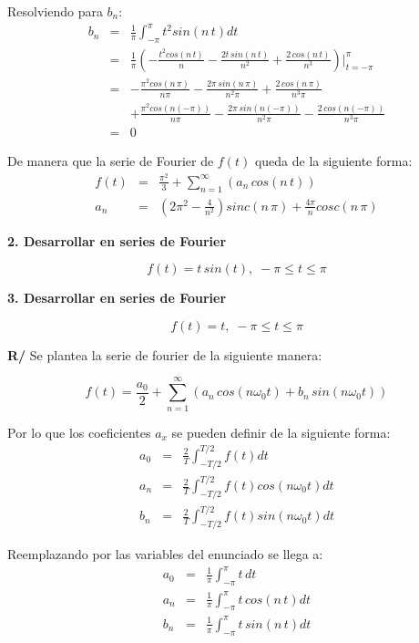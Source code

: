 \documentclass[twocolumn]{article}
\begin{document}
Resolviendo para $b_n$:
\begin{eqnarray*}
b_n &=& \frac{1}{\pi}\int_{-\pi}^{\pi}t^2sin(n\,t)dt\\
&=& \frac{1}{\pi} \left(-\frac{t^2cos(n\,t)}{n} - \frac{2t\,sin(n\,t)}{n^2} + \frac{2\,cos(n\,t)}{n^3}\right)\bigg|_{t=-\pi}^{\pi}\\
&=& -\frac{\pi^2cos(n\,\pi)}{n\pi} - \frac{2\pi\,sin(n\,\pi)}{n^2\pi} + \frac{2\,cos(n\,\pi)}{n^3\pi}\\
& &+ \frac{\pi^2cos(n(-\pi))}{n\pi} - \frac{2\pi\,sin(n(-\pi))}{n^2\pi} - \frac{2\,cos(n(-\pi))}{n^3\pi}\\
&=& 0
\end{eqnarray*}

De manera que la serie de Fourier de $f(t)$ queda de la siguiente forma:
\begin{eqnarray*}
f(t) &=& \frac{\pi^2}{3} + \sum_{n=1}^\infty\left(a_n\,cos(n\,t)\right)\\
a_n &=& \left(2\pi^2  - \frac{4}{n^2} \right) sinc(n\,\pi) + \frac{4\pi}{n}cosc(n\,\pi)
\end{eqnarray*}

\textbf{2. Desarrollar en series de Fourier}

$$f(t) = t \, sin(t),\; -\pi \leq t \leq \pi$$

\textbf{3. Desarrollar en series de Fourier}

$$f(t) = t,\; -\pi \leq t \leq \pi$$

\textbf{R/} Se plantea la serie de fourier de la siguiente manera:

$$f(t) = \frac{a_0}{2} + \sum_{n=1}^\infty\left(a_n\,cos(n\omega_0t) + b_n\,sin(n\omega_0t)\right)$$

Por lo que los coeficientes $a_x$ se pueden definir de la siguiente forma:
\begin{eqnarray*}
a_0 &=& \frac{2}{T}\int_{-T/2}^{T/2}f(t)dt\\
a_n &=& \frac{2}{T}\int_{-T/2}^{T/2}f(t)cos(n\omega_0t)dt\\
b_n &=& \frac{2}{T}\int_{-T/2}^{T/2}f(t)sin(n\omega_0t)dt
\end{eqnarray*}

Reemplazando por las variables del enunciado se llega a:
\begin{eqnarray*}
a_0 &=& \frac{1}{\pi}\int_{-\pi}^{\pi}t\,dt\\
a_n &=& \frac{1}{\pi}\int_{-\pi}^{\pi}t\,cos(n\,t)dt\\
b_n &=& \frac{1}{\pi}\int_{-\pi}^{\pi}t\,sin(n\,t)dt
\end{eqnarray*}
\end{document}
